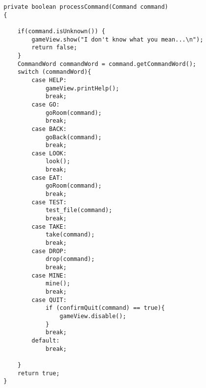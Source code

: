 \documentclass[a4paper , 10pt]{article}
\begin{document}
\begin{verbatim}
        private boolean processCommand(Command command) 
        {
    
            if(command.isUnknown()) {
                gameView.show("I don't know what you mean...\n");
                return false;
            }
            CommandWord commandWord = command.getCommandWord();
            switch (commandWord){
                case HELP:
                    gameView.printHelp();
                    break;
                case GO:
                    goRoom(command);
                    break;
                case BACK:
                    goBack(command);
                    break;
                case LOOK:
                    look();
                    break;
                case EAT:
                    goRoom(command);
                    break;
                case TEST:
                    test_file(command);
                    break;
                case TAKE:
                    take(command);
                    break;
                case DROP:
                    drop(command);
                    break;
                case MINE:
                    mine();
                    break;
                case QUIT:
                    if (confirmQuit(command) == true){
                        gameView.disable();
                    }
                    break;
                default:
                    break;
    
            }
            return true;
        } 
\end{verbatim}
\end{document}
